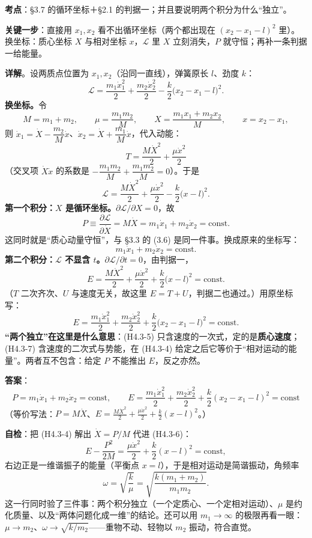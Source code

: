 \documentclass[11pt]{ctexart}
\begin{document}

\textbf{考点}：§3.7 的循环坐标＋§2.1 的判据一；并且要说明两个积分为什么“独立”。

\textbf{关键一步}：直接用 $x_1,x_2$ 看不出循环坐标（两个都出现在 $(x_2-x_1-l)^2$ 里）。换坐标：质心坐标 $X$ 与相对坐标 $x$，$\mathcal{L}$ 里 $X$ 立刻消失，$P$ 就守恒；再补一条判据一给能量。

\textbf{详解}。设两质点位置为 $x_1,x_2$（沿同一直线），弹簧原长 $l$、劲度 $k$：
\[
\mathcal{L}=\frac{m_1\dot x_1^2}{2}+\frac{m_2\dot x_2^2}{2}-\frac{k}{2}\bigl(x_2-x_1-l\bigr)^2 . \tag{H4.3-1}
\]
\textbf{换坐标。}令
\[
M=m_1+m_2,\qquad \mu=\frac{m_1m_2}{M},\qquad
X=\frac{m_1x_1+m_2x_2}{M},\qquad x=x_2-x_1 ,
\]
则 $\dot x_1=\dot X-\dfrac{m_2}{M}\dot x$、$\dot x_2=\dot X+\dfrac{m_1}{M}\dot x$，代入动能：
\[
T=\frac{M\dot X^2}{2}+\frac{\mu\dot x^2}{2} \tag{H4.3-2}
\]
（交叉项 $\dot X\dot x$ 的系数是 $-\dfrac{m_1m_2}{M}+\dfrac{m_1m_2}{M}=0$）。于是
\[
\mathcal{L}=\frac{M\dot X^2}{2}+\frac{\mu\dot x^2}{2}-\frac{k}{2}\bigl(x-l\bigr)^2 . \tag{H4.3-3}
\]
\textbf{第一个积分：$X$ 是循环坐标。}$\partial\mathcal{L}/\partial X=0$，故
\[
P\equiv\frac{\partial\mathcal{L}}{\partial\dot X}=M\dot X=m_1\dot x_1+m_2\dot x_2=\text{const}. \tag{H4.3-4}
\]
这同时就是“质心动量守恒”，与 §3.3 的 (3.6) 是同一件事。换成原来的坐标写：
\[
m_1\dot x_1+m_2\dot x_2=\text{const}. \tag{H4.3-5}
\]
\textbf{第二个积分：$\mathcal{L}$ 不显含 $t$。}$\partial\mathcal{L}/\partial t=0$，由判据一，
\[
E=\frac{M\dot X^2}{2}+\frac{\mu\dot x^2}{2}+\frac{k}{2}\bigl(x-l\bigr)^2=\text{const}. \tag{H4.3-6}
\]
（$T$ 二次齐次、$U$ 与速度无关，故这里 $E=T+U$，判据二也通过。）用原坐标写：
\[
E=\frac{m_1\dot x_1^2}{2}+\frac{m_2\dot x_2^2}{2}+\frac{k}{2}\bigl(x_2-x_1-l\bigr)^2=\text{const}. \tag{H4.3-7}
\]
\textbf{“两个独立”在这里是什么意思}：(H4.3-5) 只含速度的一次式，定的是\textbf{质心速度}；(H4.3-7) 含速度的二次式与势能，在 (H4.3-4) 给定之后它等价于“相对运动的能量”。两者互不包含：给定 $P$ 不能推出 $E$，反之亦然。

\textbf{答案}：
\[
\boxed{\;P=m_1\dot x_1+m_2\dot x_2=\text{const},\qquad
E=\frac{m_1\dot x_1^2}{2}+\frac{m_2\dot x_2^2}{2}+\frac{k}{2}(x_2-x_1-l)^2=\text{const}\;}
\]
（等价写法：$P=M\dot X$、$E=\frac{M\dot X^2}{2}+\frac{\mu\dot x^2}{2}+\frac{k}{2}(x-l)^2$。）

\textbf{自检}：把 (H4.3-4) 解出 $\dot X=P/M$ 代进 (H4.3-6)：
\[
E-\frac{P^2}{2M}=\frac{\mu\dot x^2}{2}+\frac{k}{2}(x-l)^2=\text{const},
\]
右边正是一维谐振子的能量（平衡点 $x=l$），于是相对运动是简谐振动，角频率
\[
\omega=\sqrt{\frac{k}{\mu}}=\sqrt{\frac{k(m_1+m_2)}{m_1m_2}} .
\]
这一行同时验了三件事：两个积分独立（一个定质心、一个定相对运动）、$\mu$ 是约化质量、以及“两体问题化成一维”的结论。还可以用 $m_1\to\infty$ 的极限再看一眼：$\mu\to m_2$、$\omega\to\sqrt{k/m_2}$——重物不动、轻物以 $m_2$ 振动，符合直觉。
\end{document}
